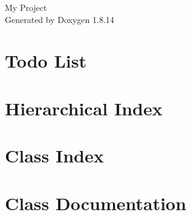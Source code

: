 \documentclass[twoside]{book}
\newcommand{\+}{\discretionary{\mbox{\scriptsize$\hookleftarrow$}}{}{}}
\newcommand{\clearemptydoublepage}{%
  \newpage{\pagestyle{empty}\cleardoublepage}%
}
\begin{document}
\hypersetup{pageanchor=false,
             bookmarksnumbered=true,
             pdfencoding=unicode
            }
\begin{titlepage}
\vspace*{7cm}
\begin{center}%
{\Large My Project }\\
\vspace*{1cm}
{\large Generated by Doxygen 1.8.14}\\
\end{center}
\end{titlepage}
\clearemptydoublepage
{}
\tableofcontents
\clearemptydoublepage
{}
\hypersetup{pageanchor=true}

\chapter{Todo List}
\label{todo}

\chapter{Hierarchical Index}

\chapter{Class Index}

\chapter{Class Documentation}

















































\backmatter
\newpage
{}
\clearemptydoublepage
{}
\printindex
\end{document}
